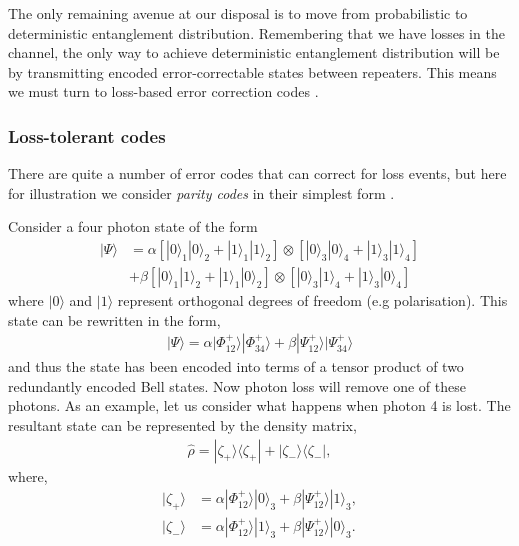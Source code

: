 \documentclass[twocolumn, aps, rmp, amsmath, amssymb, nofootinbib, superscriptaddress, longbibliography, floatfix, table-of-contents, eqsecnum]{revtex4-1}
\begin{document}
The only remaining avenue at our disposal is to move from probabilistic to deterministic entanglement distribution. Remembering that we have losses in the channel, the only way to achieve deterministic entanglement distribution will be by transmitting encoded error-correctable states between repeaters. This means we must turn to loss-based error correction codes \cite{bib:ralph05, bib:munro12, bib:Fowler10, bib:ATL13, bib:MKLLJ14}.  

\subsubsection{Loss-tolerant codes}

There are quite a number of error codes that can correct for loss events, but here for illustration we consider \textit{parity codes} in their simplest form \cite{bib:ralph05, bib:munro12}. 

Consider a four photon state of the form
\begin{align}
|\Psi\rangle &= \alpha \left[|0\rangle_1 |0\rangle_2+|1\rangle_1 |1\rangle_2\right] \otimes \left[|0\rangle_3 |0\rangle_4+|1\rangle_3 |1\rangle_4\right] \nonumber \\
&+ \beta \left[|0\rangle_1 |1\rangle_2+|1\rangle_1 |0\rangle_2\right] \otimes \left[|0\rangle_3 |1\rangle_4+|1\rangle_3 |0\rangle_4\right]
\end{align}
where $|0\rangle$ and $|1\rangle$ represent orthogonal degrees of freedom (e.g polarisation). This state can be rewritten in the form,
\begin{align}\label{eq:third_gen_red_enc}
|\Psi\rangle = \alpha |\Phi_{12}^+\rangle  |\Phi_{34}^+\rangle+\beta |\Psi_{12}^+\rangle  |\Psi_{34}^+\rangle
\end{align}
and thus the state has been encoded into terms of a tensor product of two redundantly encoded Bell states. Now photon loss will remove one of these photons. As an example, let us consider what happens when photon 4 is lost. The resultant state can be represented by the density matrix,
\begin{align}
	\hat\rho= |\zeta_+\rangle \langle \zeta_+| +|\zeta_-\rangle \langle \zeta_-|,
	\end{align}
where,
\begin{align}
|\zeta_+\rangle &=  \alpha |\Phi_{12}^+\rangle |0\rangle_3 + \beta  |\Psi_{12}^+\rangle |1\rangle_3, \nonumber \\
|\zeta_-\rangle &=  \alpha |\Phi_{12}^+\rangle |1\rangle_3 + \beta  |\Psi_{12}^+\rangle |0\rangle_3.
\end{align}
\end{document}
